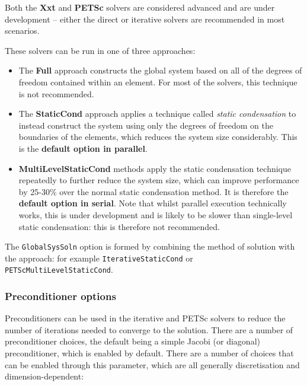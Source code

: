 \begin{warningbox}
Both the \textbf{Xxt} and \textbf{PETSc} solvers are considered advanced and are
under development -- either the direct or iterative solvers are recommended in
most scenarios.
\end{warningbox}

These solvers can be run in one of three approaches:

\begin{itemize}
  \item The \textbf{Full} approach constructs the global system based on all of
  the degrees of freedom contained within an element. For most of the \nekpp
  solvers, this technique is not recommended.
  \item The \textbf{StaticCond} approach applies a technique called \emph{static
    condensation} to instead construct the system using only the degrees of
  freedom on the boundaries of the elements, which reduces the system size
  considerably. This is the \textbf{default option in parallel}.
  \item \textbf{MultiLevelStaticCond} methods apply the static condensation
  technique repeatedly to further reduce the system size, which can improve
  performance by 25-30\% over the normal static condensation method. It is
  therefore the \textbf{default option in serial}. Note that whilst parallel
  execution technically works, this is under development and is likely to be
  slower than single-level static condensation: this is therefore not
  recommended.
\end{itemize}

The \texttt{GlobalSysSoln} option is formed by combining the method of solution
with the approach: for example \texttt{IterativeStaticCond} or
\texttt{PETScMultiLevelStaticCond}.

\subsubsection{Preconditioner options}

Preconditioners can be used in the iterative and PETSc solvers to reduce the
number of iterations needed to converge to the solution. There are a number of
preconditioner choices, the default being a simple Jacobi (or diagonal)
preconditioner, which is enabled by default. There are a number of choices that
can be enabled through this parameter, which are all generally discretisation
and dimension-dependent:

